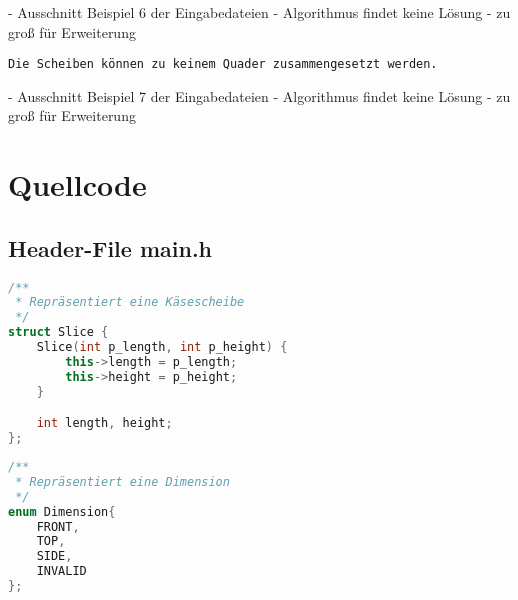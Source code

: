 \documentclass[a4paper,10pt,ngerman]{scrartcl}
\begin{document}
    - Ausschnitt Beispiel 6 der Eingabedateien
    - Algorithmus findet keine Lösung
    - zu groß für Erweiterung

    \begin{lstlisting}[frame=single, title=Programmausgabe kaese7.txt, breaklines=true,label={lst:lstlisting12}]
    Die Scheiben können zu keinem Quader zusammengesetzt werden.
    \end{lstlisting}

    - Ausschnitt Beispiel 7 der Eingabedateien
    - Algorithmus findet keine Lösung
    - zu groß für Erweiterung


    \newpage


    \section{Quellcode}
    \label{sec:quellcode}
    \label{LastPage}

    \subsection{Header-File main.h}\label{subsec:header-file}

    \begin{lstlisting}[frame=single,language=C++,title=Struct Slice,breaklines=true,label={lst:code_slice}]
/**
 * Repräsentiert eine Käsescheibe
 */
struct Slice {
    Slice(int p_length, int p_height) {
        this->length = p_length;
        this->height = p_height;
    }

    int length, height;
};
    \end{lstlisting}

    \begin{lstlisting}[frame=single,language=C++,title=Enum Dimension,breaklines=true,label={lst:code_dimension}]
/**
 * Repräsentiert eine Dimension
 */
enum Dimension{
    FRONT,
    TOP,
    SIDE,
    INVALID
};
    \end{lstlisting}
\end{document}
